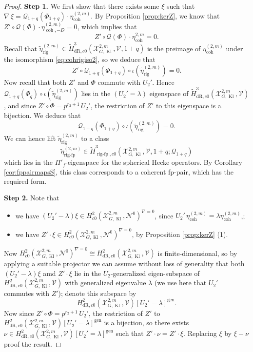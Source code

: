 \documentclass[cjm]{ipart}
\theoremstyle{plain}
\theoremstyle{remark}
\DeclareMathOperator{\coh}{coh}
\DeclareMathOperator{\gen}{gen}
\DeclareMathOperator{\Kl}{Kl}
\DeclareMathOperator{\rigfp}{rig-fp}
\newcommand{\cN}{\mathcal{N}}
\newcommand{\cQ}{\mathcal{Q}}
\newcommand{\cV}{\mathcal{V}}
\newcommand{\cX}{\mathcal{X}}
\newcommand{\dR}{\mathrm{dR}}
\newcommand{\rig}{\mathrm{rig}}
\newcommand{\wH}{\widetilde{H}}
\numberwithin{equation}{subsection}
\begin{document}
\begin{proof}

 \textbf{Step 1.}  We first show that there exists some $\xi$ such that $\nabla\,\xi=\cQ_{1+q}(\Phi_{1+q})\cdot \eta_{\coh}^{(2,m)}$.  By Proposition \ref{prop:kerZ}, we know that $Z'\circ \cQ(\Phi)\cdot \eta_{\coh,-D}^{(2,m)}=0$, which implies that
 \[ Z'\circ \cQ(\Phi)\cdot \eta_{\coh}^{2,m}=0. \]
 Recall that $\tilde\eta^{(2,m)}_{\rig}\in \wH^3_{\dR,c0}(\cX^{2,m}_{G,\Kl},\cV,1+q)$ is the preimage of $\eta_{\coh}^{(2,m)}$ under the isomorphism \eqref{eq:cohrigiso2}, so we deduce that
 \[ Z'\circ \cQ_{1+q}(\Phi_{1+q})\circ\iota ( \tilde\eta^{(2,m)}_{\rig})=0.\]
 Now recall that both $Z'$ and $\Phi$ commute with $U_2'$. Hence $\cQ_{1+q}(\Phi_{q})\circ\iota(\tilde\eta^{(2,m)}_{\rig})$ lies in the $(U_2'=\lambda)$ eigenspace of $ \wH^3_{\dR,c0}(\cX^{2,m}_{G,\Kl},\cV)$, and since $Z'\circ\Phi=p^{r_2+1}\, U_2'$, the restriction of $Z'$ to this eigenspace is a bijection. We deduce that
 \[  \cQ_{1+q}(\Phi_{1+q}) \circ \iota (\tilde\eta^{(2,m)}_{\rig})=0.\]
 We can hence lift $\tilde\eta^{(2,m)}_{\rig}$ to a class
 \[ \tilde\eta^{(2,m)}_{\rigfp} \in \wH^3_{\rigfp,c0}(\cX^{2,m}_{G,\Kl},\cV,1+q;\cQ_{1+q})   \]
 which lies in the $\Pi'_f$-eigenspace for the spherical Hecke operators. By Corollary \ref{cor:fppairmapsS}, this class corresponds to a coherent fp-pair, which has the required form.
 \vspace{1ex}

 \textbf{Step 2.} Note that
 \begin{itemize}
  \item we have  $(U_2'-\lambda)\xi\in H^2_{c0}(\cX^{2,m}_{G,\Kl},\cN^0)^{\nabla=0}$, since $U_2'\,\eta_{\coh}^{(2,m)}=\lambda\eta_{\coh}^{(2,m)}$,;
  \item we have $Z'\cdot\xi\in H^2_{c0}(\cX^{2,m}_{G,\Kl},\cN^0)^{\nabla=0}$, by Proposition \ref{prop:kerZ} (1).
 \end{itemize}
 Now $H^2_{c0}(\cX^{2,m}_{G,\Kl},\cN^0)^{\nabla=0}\cong H^2_{\dR,c0}(\cX^{2,m}_{G,\Kl},\cV)$ is finite-dimensional, so by applying a suitable projector we can assume without loss of generality that both $(U_2'-\lambda)\xi$ amd $Z'\cdot \xi$ lie in the $U_2$-generalized eigen-subspace of $H^2_{\dR,c0}(\cX^{2,m}_{G,\Kl},\cV)$ with generalized eigenvalue $\lambda$ (we use here that $U_2'$ commutes with $Z'$); denote this subspace by
 \[ H^2_{\dR,c0}(\cX^{2,m}_{G,\Kl},\cV)[U_2'=\lambda]^{\gen}.\]
 Now since $Z'\circ\Phi=p^{r_2+1}\, U_2'$, the restriction of $Z'$ to $H^2_{\dR,c0}(\cX^{2,m}_{G,\Kl},\cV)[U_2'=\lambda]^{\gen}$ is a bijection, so there exists $\nu\in H^2_{\dR,c0}(\cX^{2,m}_{G,\Kl},\cV)[U_2'=\lambda]^{\gen}$ such that $Z'\cdot \nu=Z'\cdot \xi$. Replacing $\xi$ by $\xi-\nu$ proof the result.
\end{proof}
\end{document}
